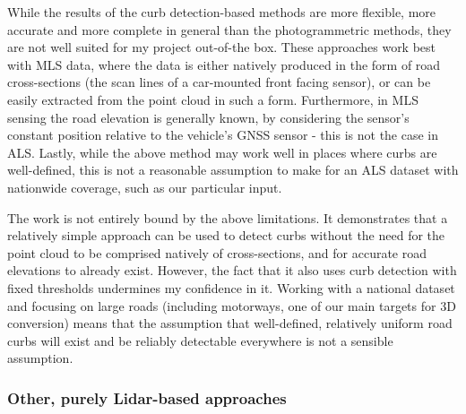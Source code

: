 While the results of the curb detection-based methods are more flexible, more accurate and more complete in general than the photogrammetric methods, they are not well suited for my project out-of-the box. These approaches work best with MLS data, where the data is either natively produced in the form of road cross-sections (the scan lines of a car-mounted front facing sensor), or can be easily extracted from the point cloud in such a form. Furthermore, in MLS sensing the road elevation is generally known, by considering the sensor's constant position relative to the vehicle's GNSS sensor - this is not the case in ALS. Lastly, while the above method may work well in places where curbs are well-defined, this is not a reasonable assumption to make for an ALS dataset with nationwide coverage, such as our particular input.

The work \cite{vosselman_zhou_2009} is not entirely bound by the above limitations. It demonstrates that a relatively simple approach can be used to detect curbs without the need for the point cloud to be comprised natively of cross-sections, and for accurate road elevations to already exist. However, the fact that it also uses curb detection with fixed thresholds undermines my confidence in it. Working with a national dataset and focusing on large roads (including motorways, one of our main targets for 3D conversion) means that the assumption that well-defined, relatively uniform road curbs will exist and be reliably detectable everywhere is not a sensible assumption.

\subsubsection{Other, purely Lidar-based approaches}

